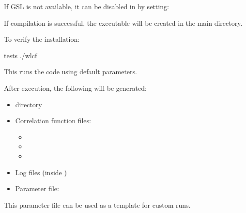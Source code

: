 \documentclass[letterpaper,10pt,english]{sphinxmanual}
\begin{document}
\sphinxAtStartPar
If GSL is not available, it can be disabled in  by setting:

\begin{sphinxVerbatim}[commandchars=\\\{\}]
\end{sphinxVerbatim}

\sphinxAtStartPar
If compilation is successful, the executable  will be created in the main directory.

\sphinxAtStartPar
To verify the installation:

\begin{sphinxVerbatim}[commandchars=\\\{\}]
tests
./wlcf
\end{sphinxVerbatim}

\sphinxAtStartPar
This runs the code using default parameters.

\sphinxAtStartPar
After execution, the following will be generated:
\begin{itemize}
\item {} 
\sphinxAtStartPar
{} directory

\item {} 
\sphinxAtStartPar
Correlation function files:
\begin{itemize}
\item {} 
\sphinxAtStartPar
{}

\item {} 
\sphinxAtStartPar
{}

\item {} 
\sphinxAtStartPar
{}

\end{itemize}

\item {} 
\sphinxAtStartPar
Log files (inside )

\item {} 
\sphinxAtStartPar
Parameter file: 

\end{itemize}

\sphinxAtStartPar
This parameter file can be used as a template for custom runs.

\sphinxAtStartPar
{}
\end{document}
